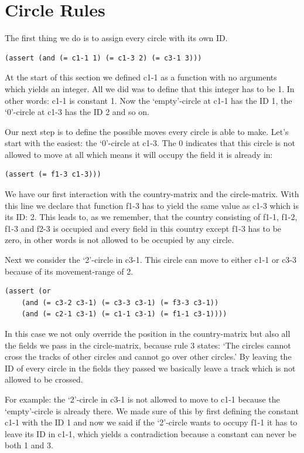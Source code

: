 \section{Circle Rules}
The first thing we do is to assign every circle with its own ID.
\begin{lstlisting}
(assert (and (= c1-1 1) (= c1-3 2) (= c3-1 3)))
\end{lstlisting}
At the start of this section we defined c1-1 as a function with no arguments which yields an integer. All we did was to define that this integer has to be 1. In other words: c1-1 is constant 1.
Now the `empty'-circle at c1-1 has the ID 1, the `0'-circle at c1-3 has the ID 2 and so on.

Our next step is to define the possible moves every circle is able to make. Let's start with the easiest: the `0'-circle at c1-3. The 0 indicates that this circle is not allowed to move at all which means it will occupy the field it is already in:
\begin{lstlisting}
(assert (= f1-3 c1-3)))
\end{lstlisting}
We have our first interaction with the country-matrix and the circle-matrix. With this line we declare that function f1-3 has to yield the same value as c1-3 which is its ID: 2. This leads to, as we remember, that the country consisting of f1-1, f1-2, f1-3 and f2-3 is occupied and every field in this country except f1-3 has to be zero, in other words is not allowed to be occupied by any circle.

Next we consider the `2'-circle in c3-1. This circle can move to either c1-1 or c3-3 because of its movement-range of 2.
\begin{lstlisting}
(assert (or 
	(and (= c3-2 c3-1) (= c3-3 c3-1) (= f3-3 c3-1)) 
	(and (= c2-1 c3-1) (= c1-1 c3-1) (= f1-1 c3-1))))
\end{lstlisting}
In this case we not only override the position in the country-matrix but also all the fields we pass in the circle-matrix, because rule 3 states: `The circles cannot cross the tracks of other circles and cannot go over other circles.' By leaving the ID of every circle in the fields they passed we basically leave a track which is not allowed to be crossed.

For example: the `2'-circle in c3-1 is not allowed to move to c1-1 because the `empty'-circle is already there. We made sure of this by first defining the constant c1-1 with the ID 1 and now we said if the `2'-circle wants to occupy f1-1 it has to leave its ID in c1-1, which yields a contradiction because a constant can never be both 1 and 3.


